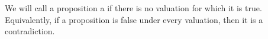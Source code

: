 \begin{node}[Definition]\label{prop-0008}%
We will call a proposition a  if there is no
valuation for which it is true. Equivalently, if a proposition is
false under every valuation, then it is a contradiction.
\end{node}
